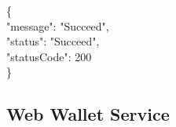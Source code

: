 \begin{framed}
    \hspace*{13mm}        \{ \\
    \hspace*{13mm}                "message": "Succeed",    \\
    \hspace*{13mm}                "status": "Succeed",    \\
    \hspace*{13mm}             "statusCode": 200    \\
    \hspace*{13mm}                 \}    \\
\end{framed}
















\subsection{Web Wallet Service}
\label{webui}